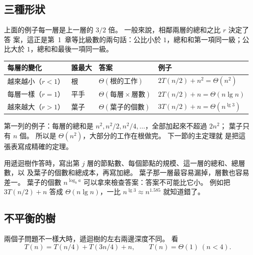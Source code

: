 \subsection{三種形狀}

上面的例子每一層是上一層的 $3/2$ 倍。 一般來說，相鄰兩層的總和之比 $r$ 決定了答
案，這正是第~1~章等比級數的兩句話：公比小於 $1$，總和和第一項同一級；公比大於
$1$，總和和最後一項同一級。

\begin{center}
\begin{tabular}{llll}
\toprule
每層的變化 & 誰最大 & 答案 & 例子 \\
\midrule
越來越小（$r < 1$） & 根 & $\Theta(\text{根的工作})$ &
$2T(n/2) + n^2 = \Theta(n^2)$ \\
每層一樣（$r = 1$） & 平手 & $\Theta(\text{每層} \times \text{層數})$ &
$2T(n/2) + n = \Theta(n \lg n)$ \\
越來越大（$r > 1$） & 葉子 & $\Theta(\text{葉子的個數})$ &
$3T(n/2) + n = \Theta(n^{\lg 3})$ \\
\bottomrule
\end{tabular}
\end{center}

第一列的例子：每層的總和是 $n^2, n^2/2, n^2/4, \ldots$，全部加起來不超過 $2n^2$；
葉子只有 $n$ 個。 所以是 $\Theta(n^2)$，大部分的工作在根做完。 下一節的主定理就
是把這張表寫成精確的定理。

\begin{examnote}
用遞迴樹作答時，寫出第 $j$ 層的節點數、每個節點的規模、這一層的總和、總層數，以
及葉子的個數和總成本，再寫加總。 葉子那一層最容易漏掉，層數也容易差一。 葉子的個數
$n^{\log_b a}$ 可以拿來檢查答案：答案不可能比它小。 例如把 $3T(n/2) + n$ 答成
$\Theta(n \lg n)$，一比 $n^{\lg 3} \approx n^{1.585}$ 就知道錯了。
\end{examnote}

\subsection{不平衡的樹}

兩個子問題不一樣大時，遞迴樹的左右兩邊深度不同。 看
\[
T(n) = T(n/4) + T(3n/4) + n, \qquad T(n) = \Theta(1) \ (n < 4).
\]

